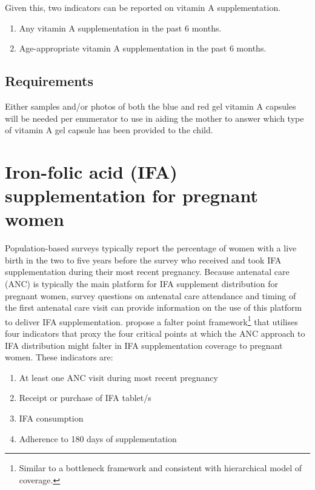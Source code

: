 \documentclass[12pt,a4paper]{book}
\let\rmarkdownfootnote\footnote%
\def\footnote{\protect\rmarkdownfootnote}
\theoremstyle{definition}
\theoremstyle{definition}
\theoremstyle{definition}
\theoremstyle{remark}
\begin{document}
Given this, two indicators can be reported on vitamin A supplementation.

\begin{enumerate}
\def\labelenumi{\arabic{enumi}.}
\item
  Any vitamin A supplementation in the past 6 months.
\item
  Age-appropriate vitamin A supplementation in the past 6 months.
\end{enumerate}

\hypertarget{requirements-1}{%
\subsection{Requirements}\label{requirements-1}}

Either samples and/or photos of both the blue and red gel vitamin A
capsules will be needed per enumerator to use in aiding the mother to
answer which type of vitamin A gel capsule has been provided to the
child.

\hypertarget{iron-folic-acid-ifa-supplementation-for-pregnant-women}{%
\section{Iron-folic acid (IFA) supplementation for pregnant
women}\label{iron-folic-acid-ifa-supplementation-for-pregnant-women}}

Population-based surveys typically report the percentage of women with a
live birth in the two to five years before the survey who received and
took IFA supplementation during their most recent pregnancy. Because
antenatal care (ANC) is typically the main platform for IFA supplement
distribution for pregnant women, survey questions on antenatal care
attendance and timing of the first antenatal care visit can provide
information on the use of this platform to deliver IFA supplementation.
\citet{Sununtnasuk:2015kb} propose a falter point framework\footnote{Similar
  to a bottleneck framework and consistent with \citet{Tanahashi:1978we}
  hierarchical model of coverage.} that utilises four indicators that
proxy the four critical points at which the ANC approach to IFA
distribution might falter in IFA supplementation coverage to pregnant
women. These indicators are:

\begin{enumerate}
\def\labelenumi{\arabic{enumi}.}
\item
  At least one ANC visit during most recent pregnancy
\item
  Receipt or purchase of IFA tablet/s
\item
  IFA consumption
\item
  Adherence to 180 days of supplementation
\end{enumerate}
\end{document}
